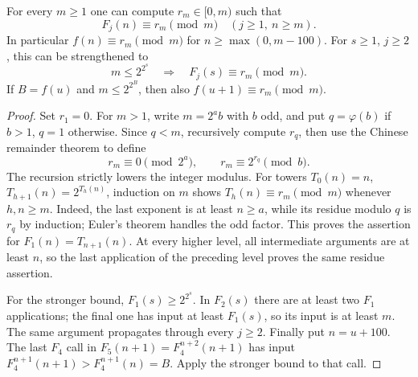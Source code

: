 \documentclass[11pt]{article}
\begin{document}
\begin{lemma}\label{lem:residues}
For every $m\ge1$ one can compute $r_m\in[0,m)$ such that
\[
 F_j(n)\equiv r_m\pmod m\quad(j\ge1,\ n\ge m).
\]
In particular $f(n)\equiv r_m\pmod m$ for $n\ge\max(0,m-100)$.
For $s\ge1$, $j\ge2$, this can be strengthened to
\begin{equation}\label{eq:envelope}
 m\le 2^{2^s}\quad\Longrightarrow\quad F_j(s)\equiv r_m\pmod m.
\end{equation}
If $B=f(u)$ and $m\le2^{2^B}$, then also $f(u+1)\equiv r_m\pmod m$.
\end{lemma}
\begin{proof}
Set $r_1=0$. For $m>1$, write $m=2^a b$ with $b$ odd, and put
$q=\varphi(b)$ if $b>1$, $q=1$ otherwise. Since $q<m$, recursively
compute $r_q$, then use the Chinese remainder theorem to define
\[
 r_m\equiv0\pmod{2^a},\qquad r_m\equiv2^{r_q}\pmod b.
\]
The recursion strictly lowers the integer modulus.
For towers $T_0(n)=n$, $T_{h+1}(n)=2^{T_h(n)}$, induction on $m$ shows
$T_h(n)\equiv r_m\pmod m$ whenever $h,n\ge m$. Indeed, the last exponent
is at least $n\ge a$, while its residue modulo $q$ is $r_q$ by induction;
Euler's theorem handles the odd factor. This proves the assertion for
$F_1(n)=T_{n+1}(n)$. At every higher level, all intermediate arguments are
at least $n$, so the last application of the preceding level proves the
same residue assertion.

For the stronger bound, $F_1(s)\ge2^{2^s}$. In $F_2(s)$ there are at
least two $F_1$ applications; the final one has input at least $F_1(s)$,
so its input is at least $m$. The same argument propagates through every
$j\ge2$. Finally put $n=u+100$. The last $F_4$ call in
$F_5(n+1)=F_4^{n+2}(n+1)$ has input
$F_4^{n+1}(n+1)>F_4^{n+1}(n)=B$. Apply the stronger bound to that call.
\end{proof}
\end{document}
